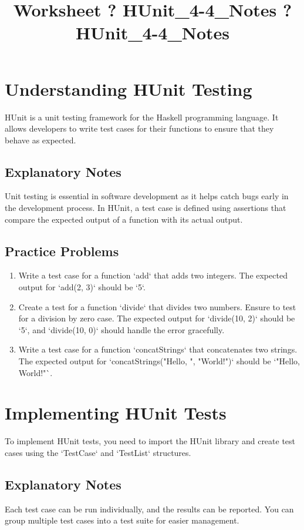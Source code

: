 \documentclass{article}
\title{Worksheet ? HUnit\_4-4\_Notes ? HUnit\_4-4\_Notes}
\author{}
\date{}
\begin{document}
\maketitle

\section*{Understanding HUnit Testing}
HUnit is a unit testing framework for the Haskell programming language. It allows developers to write test cases for their functions to ensure that they behave as expected.

\subsection*{Explanatory Notes}
Unit testing is essential in software development as it helps catch bugs early in the development process. In HUnit, a test case is defined using assertions that compare the expected output of a function with its actual output.

\subsection*{Practice Problems}
\begin{enumerate}
    \item Write a test case for a function `add` that adds two integers. The expected output for `add(2, 3)` should be `5`.
    \item Create a test for a function `divide` that divides two numbers. Ensure to test for a division by zero case. The expected output for `divide(10, 2)` should be `5`, and `divide(10, 0)` should handle the error gracefully.
    \item Write a test case for a function `concatStrings` that concatenates two strings. The expected output for `concatStrings("Hello, ", "World!")` should be `"Hello, World!"`.
\end{enumerate}

\section*{Implementing HUnit Tests}
To implement HUnit tests, you need to import the HUnit library and create test cases using the `TestCase` and `TestList` structures.

\subsection*{Explanatory Notes}
Each test case can be run individually, and the results can be reported. You can group multiple test cases into a test suite for easier management.
\end{document}
